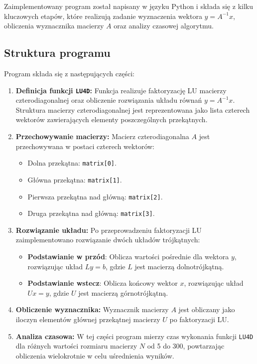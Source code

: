 \documentclass[a4paper,12pt]{article}
\begin{document}
Zaimplementowany program został napisany w języku Python i składa się z kilku kluczowych etapów, które realizują zadanie wyznaczenia wektora $y = A^{-1}x$, obliczenia wyznacznika macierzy $A$ oraz analizy czasowej algorytmu.

\subsection{Struktura programu}

Program składa się z następujących części:
\begin{enumerate}
    \item \textbf{Definicja funkcji \texttt{LU4D}:} Funkcja realizuje faktoryzację LU macierzy czterodiagonalnej oraz obliczenie rozwiązania układu równań $y = A^{-1}x$. Struktura macierzy czterodiagonalnej jest reprezentowana jako lista czterech wektorów zawierających elementy poszczególnych przekątnych.
    \item \textbf{Przechowywanie macierzy:} Macierz czterodiagonalna $A$ jest przechowywana w postaci czterech wektorów:
    \begin{itemize}
        \item Dolna przekątna: \texttt{matrix[0]}.
        \item Główna przekątna: \texttt{matrix[1]}.
        \item Pierwsza przekątna nad główną: \texttt{matrix[2]}.
        \item Druga przekątna nad główną: \texttt{matrix[3]}.
    \end{itemize}
    \item \textbf{Rozwiązanie układu:} Po przeprowadzeniu faktoryzacji LU zaimplementowano rozwiązanie dwóch układów trójkątnych:
    \begin{itemize}
    \item \textbf{Podstawianie w przód}: Oblicza wartości pośrednie dla wektora \( y \), rozwiązując układ \( Ly = b \), gdzie \( L \) jest macierzą dolnotrójkątną.
    \item \textbf{Podstawianie wstecz}: Oblicza końcowy wektor \( x \), rozwiązując układ \( Ux = y \), gdzie \( U \) jest macierzą górnotrójkątną.
    \end{itemize}

    \item \textbf{Obliczenie wyznacznika:} Wyznacznik macierzy $A$ jest obliczany jako iloczyn elementów głównej przekątnej macierzy $U$ po faktoryzacji LU.
    \item \textbf{Analiza czasowa:} W tej części program mierzy czas wykonania funkcji \texttt{LU4D} dla różnych wartości rozmiaru macierzy $N$ od 5 do 300, powtarzając obliczenia wielokrotnie w celu uśrednienia wyników.
\end{enumerate}
\end{document}

